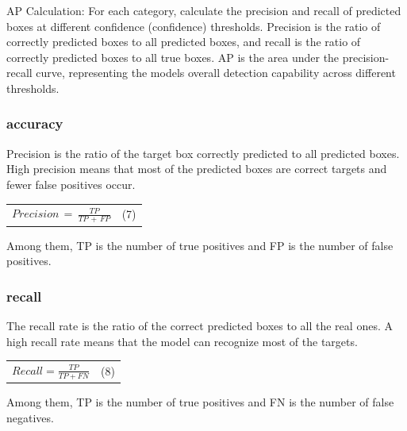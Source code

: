 \documentclass[
]{article}
\newcounter{none} %
\begin{document}
AP Calculation: For each category, calculate the precision and recall of
predicted boxes at different confidence (confidence) thresholds.
Precision is the ratio of correctly predicted boxes to all predicted
boxes, and recall is the ratio of correctly predicted boxes to all true
boxes. AP is the area under the precision-recall curve, representing the
model\textquotesingle s overall detection capability across different
thresholds.

\subsubsection{accuracy}\label{accuracy}

Precision is the ratio of the target box correctly predicted to all
predicted boxes. High precision means that most of the predicted boxes
are correct targets and fewer false positives occur.

{\def\LTcaptype{none} %
\begin{longtable}[]{@{}
  >{\raggedright\arraybackslash}p{}
  >{\centering\arraybackslash}p{}@{}}
\toprule\noalign{}
\endhead
\bottomrule\noalign{}
\endlastfoot
\(Precision\, = \,\frac{TP}{TP\, + \, FP}\) & (7) \\
\end{longtable}
}

Among them, TP is the number of true positives and FP is the number of
false positives.

\subsubsection{recall}\label{recall}

The recall rate is the ratio of the correct predicted boxes to all the
real ones. A high recall rate means that the model can recognize most of
the targets.

{\def\LTcaptype{none} %
\begin{longtable}[]{@{}
  >{\raggedright\arraybackslash}p{}
  >{\centering\arraybackslash}p{}@{}}
\toprule\noalign{}
\endhead
\bottomrule\noalign{}
\endlastfoot
\(Recall = \frac{TP}{TP + FN}\) & (8) \\
\end{longtable}
}

Among them, TP is the number of true positives and FN is the number of
false negatives.
\end{document}
